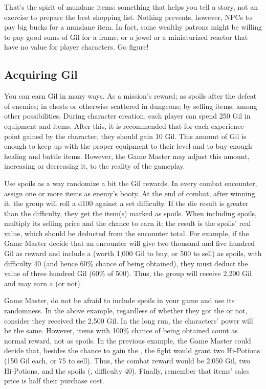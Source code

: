 \begin{multicols}{2}
That's the spirit of mundane items: something that helps you tell a story, not an exercise to prepare the best shopping list. Nothing prevents, however, NPCs to pay big bucks for a mundane item. In fact, some wealthy patrons might be willing to pay good sums of Gil for a frame, or a jewel or a miniaturized reactor that have no value for player characters. Go figure!

\subsection{Acquiring Gil}\label{subsec:inv-acquire}
You can earn Gil in many ways. As a mission’s reward; as spoils after the defeat of enemies; in chests or otherwise scattered in dungeons; by selling items; among other possibilities. During character creation, each player can spend 250 Gil in equipment and items. After this, it is recommended that for each experience point gained by the character, they should gain 10 Gil. This amount of Gil is enough to keep up with the proper equipment to their level and to buy enough healing and battle items. However, the Game Master may adjust this amount, increasing or decreasing it, to the reality of the gameplay.

Use spoils as a way randomize a bit the Gil rewards. In every combat encounter, assign one or more items as enemy’s booty. At the end of combat, after winning it, the group will roll a d100 against a set difficulty. If the die result is greater than the difficulty, they get the item(s) marked as spoils. When including spoils, multiply its selling price and the chance to earn it: the result is the spoils’ real value, which should be deducted from the encounter total. For example, if the Game Master decide that an encounter will give two thousand and five hundred Gil as reward and include a  (worth 1,000 Gil to buy, or 500 to sell) as spoils, with difficulty 40 (and hence 60\% chance of being obtained), they must deduct the value of three hundred Gil (60\% of 500). Thus, the group will receive 2,200 Gil and may earn a  (or not). %

Game Master, do not be afraid to include spoils in your game and use its randomness. In the above example, regardless of whether they got the  or not, consider they received the 2,500 Gil. In the long run, the characters’ power will be the same. However, items with 100\% chance of being obtained count as normal reward, not as spoils. In the previous example, the Game Master could decide that, besides the chance to gain the , the fight would grant two Hi-Potions (150 Gil each, or 75 to sell). Thus, the combat reward would be 2,050 Gil, two Hi-Potions, and the spoils (, difficulty 40). Finally, remember that items’ sales price is half their purchase cost.


\end{multicols}
